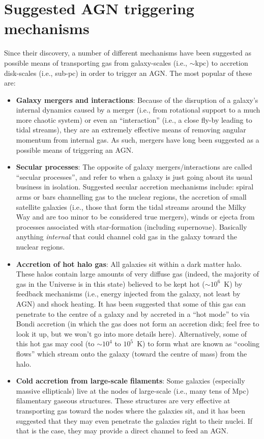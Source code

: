 \documentclass[11pt]{article}
\begin{document}
\section{Suggested AGN triggering mechanisms}
Since their discovery, a number of different mechanisms have been
suggested as possible means of transporting gas from galaxy-scales
(i.e., $\sim$kpc) to accretion disk-scales (i.e., sub-pc) in order to
trigger an AGN. The most popular of these are:
\begin{itemize}
\item {\bf Galaxy mergers and interactions}: Because of the disruption
  of a galaxy's internal dynamics caused by a merger (i.e., from
  rotational support to a much more chaotic system) or even an
  ``interaction'' (i.e., a close fly-by leading to tidal streams),
  they are an extremely effective means of removing angular momentum
  from internal gas. As such, mergers have long been suggested as a
  possible means of triggering an AGN.
\item {\bf Secular processes}: The opposite of galaxy
  mergers/interactions are called ``secular processes'', and refer to
  when a galaxy is just going about its usual business in
  isolation. Suggested secular accretion mechanisms include: spiral
  arms or bars channelling gas to the nuclear regions, the accretion
  of small satellite galaxies (i.e., those that form the tidal streams
  around the Milky Way and are too minor to be considered true
  mergers), winds or ejecta from processes associated with
  star-formation (including supernovae). Basically anything {\it
    internal} that could channel cold gas in the galaxy toward the
  nuclear regions.
\item {\bf Accretion of hot halo gas}: All galaxies sit within a dark
  matter halo. These halos contain large amounts of very diffuse gas
  (indeed, the majority of gas in the Universe is in this state)
  believed to be kept hot ($\sim10^6$~K) by feedback mechanisms (i.e.,
  energy injected from the galaxy, not least by AGN) and shock
  heating. It has been suggested that some of this gas can penetrate
  to the centre of a galaxy and by accreted in a ``hot mode'' to via
  Bondi accretion (in which the gas does not form an accretion disk;
  feel free to look it up, but we won't go into more details
  here). Alternatively, some of this hot gas may cool (to $\sim10^4$
  to $10^5$~K) to form what are known as ``cooling flows'' which
  stream onto the galaxy (toward the centre of mass) from the halo.
\item {\bf Cold accretion from large-scale filaments}: Some galaxies
  (especially massive ellipticals) live at the nodes of large-scale
  (i.e., many tens of Mpc) filamentary gaseous structures. These
  structures are very effective at transporting gas toward the nodes
  where the galaxies sit, and it has been suggested that they may even
  penetrate the galaxies right to their nuclei. If that is the case,
  they may provide a direct channel to feed an AGN.
\end{itemize}
\end{document}
